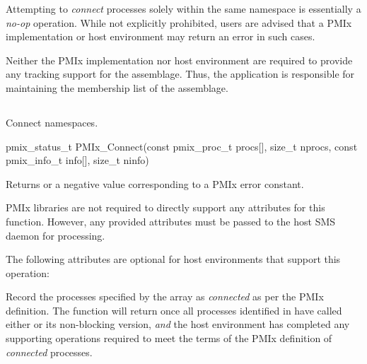 \adviceuserstart
Attempting to \textit{connect} processes solely within the same namespace is essentially a \textit{no-op} operation. While not explicitly prohibited, users are advised that a \ac{PMIx} implementation or host environment may return an error in such cases.

Neither the \ac{PMIx} implementation nor host environment are required to provide any tracking support for the assemblage. Thus, the application is responsible for maintaining the membership list of the assemblage.
\adviceuserend


\subsection{}

\summary

Connect namespaces.

\format

\cspecificstart
\begin{codepar}
pmix_status_t
PMIx_Connect(const pmix_proc_t procs[], size_t nprocs,
             const pmix_info_t info[], size_t ninfo)
\end{codepar}
\cspecificend

\begin{arglist}
\end{arglist}

Returns  or a negative value corresponding to a PMIx error constant.

\reqattrstart
\ac{PMIx} libraries are not required to directly support any attributes for this function. However, any provided attributes must be passed to the host \ac{SMS} daemon for processing.

\reqattrend

\optattrstart
The following attributes are optional for host environments that support this operation:


\optattrend

\descr

Record the processes specified by the  array as \textit{connected} as per the \ac{PMIx} definition. The function will return once all processes identified in  have called either  or its non-blocking version, \textit{and} the host environment has completed any supporting operations required to meet the terms of the \ac{PMIx} definition of \textit{connected} processes.

